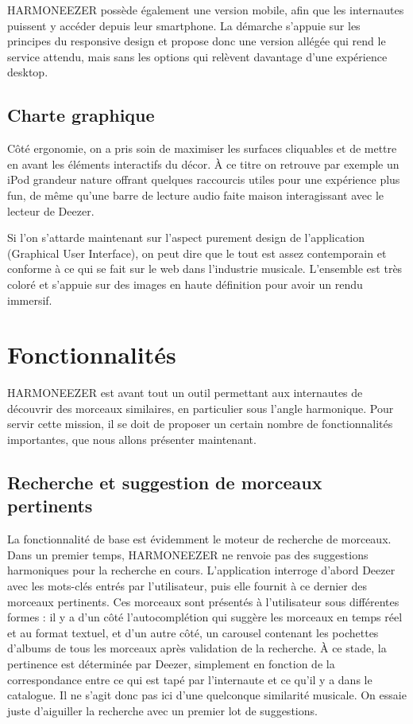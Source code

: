 \documentclass[a4paper,12pt]{article}
\begin{document}
HARMONEEZER possède également une version mobile, afin que les internautes puissent y accéder depuis leur smartphone. La démarche s'appuie sur les principes du responsive design et propose donc une version allégée qui rend le service attendu, mais sans les options qui relèvent davantage d'une expérience desktop.

\subsection{Charte graphique}

Côté ergonomie, on a pris soin de maximiser les surfaces cliquables et de mettre en avant les éléments interactifs du décor. À ce titre on retrouve par exemple un iPod grandeur nature offrant quelques raccourcis utiles pour une expérience plus fun, de même qu'une barre de lecture audio faite maison interagissant avec le lecteur de Deezer.

Si l'on s'attarde maintenant sur l'aspect purement design de l'application (Graphical User Interface), on peut dire que le tout est assez contemporain et conforme à ce qui se fait sur le web dans l'industrie musicale. L'ensemble est très coloré et s'appuie sur des images en haute définition pour avoir un rendu immersif.

\section{Fonctionnalités}

HARMONEEZER est avant tout un outil permettant aux internautes de découvrir des morceaux similaires, en particulier sous l'angle harmonique. Pour servir cette mission, il se doit de proposer un certain nombre de fonctionnalités importantes, que nous allons présenter maintenant.

\subsection{Recherche et suggestion de morceaux pertinents}

La fonctionnalité de base est évidemment le moteur de recherche de morceaux. Dans un premier temps, HARMONEEZER ne renvoie pas des suggestions harmoniques pour la recherche en cours. L'application interroge d'abord Deezer avec les mots-clés entrés par l'utilisateur, puis elle fournit à ce dernier des morceaux pertinents. Ces morceaux sont présentés à l'utilisateur sous différentes formes : il y a d'un côté l'autocomplétion qui suggère les morceaux en temps réel et au format textuel, et d'un autre côté, un carousel contenant les pochettes d'albums de tous les morceaux après validation de la recherche. À ce stade, la pertinence est déterminée par Deezer, simplement en fonction de la correspondance entre ce qui est tapé par l'internaute et ce qu'il y a dans le catalogue. Il ne s'agit donc pas ici d'une quelconque similarité musicale. On essaie juste d'aiguiller la recherche avec un premier lot de suggestions.
\end{document}
